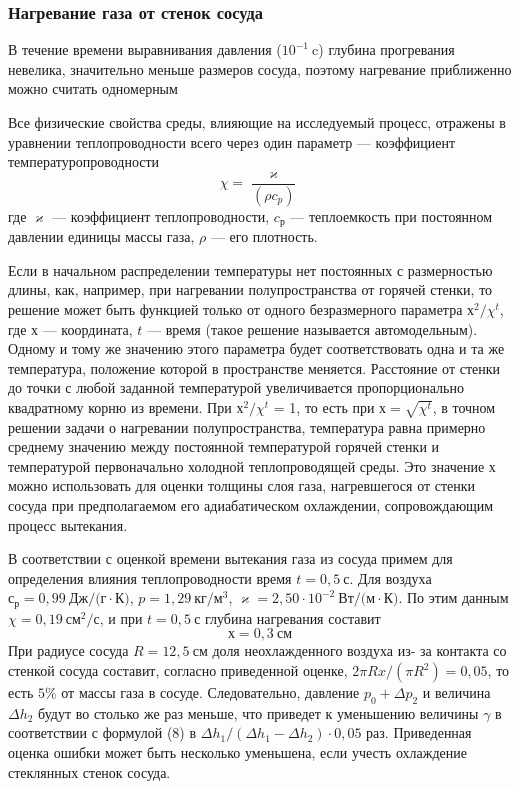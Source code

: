 \documentclass[a4paper,12pt]{article}
\theoremstyle{plain} %
\theoremstyle{definition} %
\theoremstyle{remark} %
\begin{document}
\subsubsection{Нагревание газа от стенок сосуда}
В течение времени выравнивания давления ($10^{-1}\ \text{c}$) глубина прогревания невелика, значительно меньше размеров сосуда, поэтому нагревание приближенно можно считать одномерным

Все физические свойства среды, влияющие на исследуемый процесс, отражены в уравнении теплопроводности всего через один параметр — коэффициент температуропроводности 
\begin{equation}
\chi = \frac{\varkappa}{(\rho c_p)}
\end{equation}
где $\varkappa$ — коэффициент теплопроводности, $c_р$ — теплоемкость при постоянном давлении единицы массы газа, $\rho$ — его плотность.

Если в начальном распределении температуры нет постоянных с размерностью длины, как, например, при нагревании полупространства от горячей стенки, то решение может быть функцией только от одного безразмерного параметра $х^2/\chi^t$, где $х$ — координата, $t$ — время (такое решение называется автомодельным). Одному и тому же значению этого параметра будет соответствовать одна и та же температура, положение которой в пространстве меняется. Расстояние от стенки до точки с любой заданной температурой увеличивается пропорционально квадратному корню из времени. При $х^2/\chi^t$ = 1, то есть при $х = \sqrt{\chi^t}$, в точном решении задачи о нагревании полупространства, температура равна примерно среднему значению между постоянной температурой горячей стенки и температурой первоначально холодной теплопроводящей среды. Это значение $х$ можно использовать для оценки толщины слоя газа, нагревшегося от стенки сосуда при предполагаемом его адиабатическом охлаждении, сопровождающим процесс вытекания.

В соответствии с оценкой времени вытекания газа из сосуда примем для определения влияния теплопроводности время $t = 0,5\ \text{с}$. Для воздуха $с_р = 0,99\ \text{Дж}/\text{(г}\cdot\text{К)}$, $p = 1,29\ \text{кг}/\text{м}^3$, $\varkappa = 2,50 \cdot 10^{-2}\ \text{Вт}/\text{(м}\cdot\text{К)}$. По этим данным $\chi = 0,19\  \text{см}^2/\text{с}$, и при $t = 0,5\ \text{с}$ глубина нагревания составит 
\[х = 0,3\ \text{см}\]
При радиусе сосуда $R = 12,5\ \text{см}$ доля неохлажденного воздуха из- за контакта со стенкой сосуда составит, согласно приведенной оценке, $2\pi Rx/(\pi R^2) = 0,05$, то есть $5\%$ от массы газа в сосуде. Следовательно, давление $p_0 + \Delta p_2$ и величина $\Delta h_2$ будут во столько же раз меньше, что приведет к уменьшению величины $\gamma$ в соответствии с формулой (8) в $\Delta h_1/(\Delta h_1 - \Delta h_2) \cdot 0,05$ раз. Приведенная оценка ошибки может быть несколько уменьшена, если учесть охлаждение стеклянных стенок сосуда.
\end{document}
